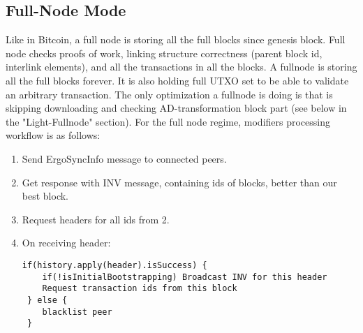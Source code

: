 \documentclass[]{article}   %
\begin{document}
\subsection{Full-Node Mode}
Like in Bitcoin, a full node is storing all the full blocks since genesis block. Full node checks proofs of work, linking structure correctness (parent block id, interlink elements), and all the transactions in all the blocks. A fullnode is storing all the full blocks forever. It is also holding full UTXO set to be able to validate an arbitrary transaction.
The only optimization a fullnode is doing is that is skipping downloading and checking AD-transformation block part (see below in the "Light-Fullnode" section).
For the full node regime, modifiers processing workflow is as follows:
\begin{enumerate}
   \item Send ErgoSyncInfo message to connected peers.
   \item Get response with INV message, containing ids of blocks, better than our best block.
   \item Request headers for all ids from 2.
   \item On receiving header:
   \begin{verbatim}
if(history.apply(header).isSuccess) {
    if(!isInitialBootstrapping) Broadcast INV for this header   
    Request transaction ids from this block
 } else {
    blacklist peer
 }
\end{verbatim} 
\vspace{1em}


\end{enumerate}
\end{document}
